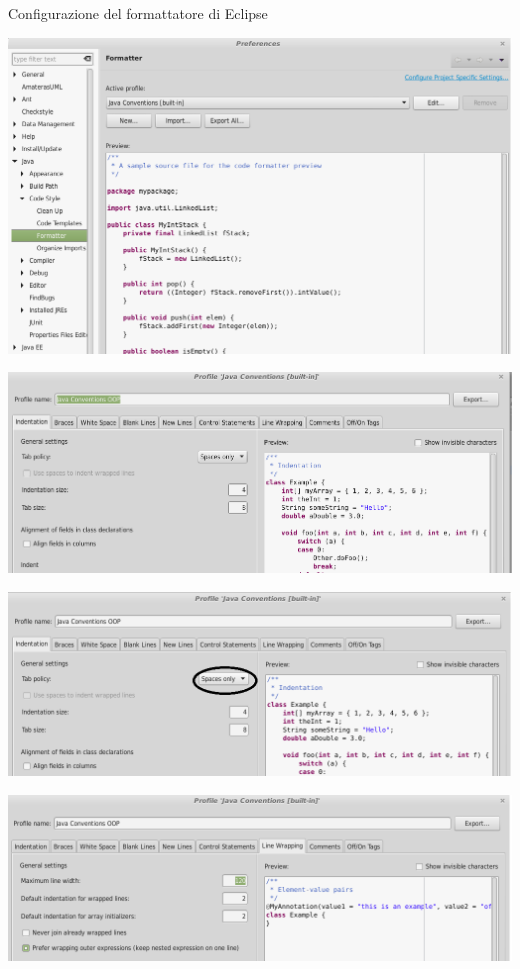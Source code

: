 \documentclass[presentation]{beamer}
\begin{document}
\begin{frame}[allowframebreaks]{Configurazione del formattatore di Eclipse}
	\begin{center}
		\includegraphics[width=.95\textwidth]{img/ideconf-1} 
	\end{center}
	\begin{center}
		\includegraphics[width=\textwidth]{img/ideconf-2}
	\end{center}
	\begin{center}
		\includegraphics[width=\textwidth]{img/ideconf-3}
	\end{center}
	\begin{center}
		\includegraphics[width=\textwidth]{img/ideconf-4}
	\end{center}
\end{frame}
\end{document}
